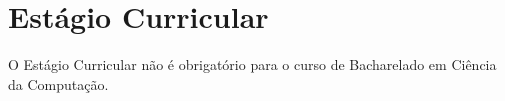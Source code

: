 \section {Estágio Curricular}

O Estágio Curricular não é obrigatório para o curso de Bacharelado em Ciência da Computação.
